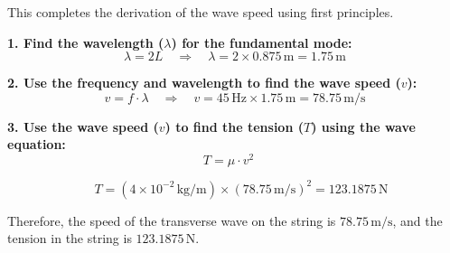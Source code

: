 \documentclass[journal,12pt,twocolumn]{IEEEtran}
\theoremstyle{remark}
\begin{document}
This completes the derivation of the wave speed using first principles.

\textbf{1. Find the wavelength (\(\lambda\)) for the fundamental mode:}
\begin{equation}\label{eq:wavelength}
    \lambda = 2L \quad \Rightarrow \quad \lambda = 2 \times 0.875 \, \text{m} = 1.75 \, \text{m}
\end{equation}

\textbf{2. Use the frequency and wavelength to find the wave speed (\(v\)):}
\begin{equation}\label{eq:wavespeed}
    v = f \cdot \lambda \quad \Rightarrow \quad v = 45 \, \text{Hz} \times 1.75 \, \text{m} = 78.75 \, \text{m/s}
\end{equation}


\textbf{3. Use the wave speed (\(v\)) to find the tension (\(T\)) using the wave equation:}
\begin{equation}\label{eq:tension}
    T = \mu \cdot v^2 \quad  
    \end{equation}
    
\begin{equation}
\quad T = (4 \times 10^{-2} \, \text{kg/m}) \times (78.75 \, \text{m/s})^2 = 123.1875 \, \text{N}
\end{equation}

Therefore, the speed of the transverse wave on the string is $78.75 \, \text{m/s}$, and the tension in the string is $123.1875 \, \text{N}$.
\end{document}
